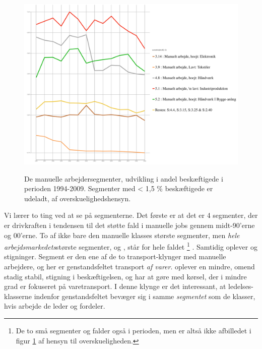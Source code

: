 %
   \begin{figure}[H]
   \begin{centering}
    \caption[Tidsserie: De manuelle arbejdersegmenter]{De manuelle arbejdersegmenter, udvikling i andel beskæftigede i perioden 1994-2009. Segmenter med < 1,5 \% beskæftigede er udeladt, af overskuelighedshensyn.} %
    \includegraphics[width=\textwidth]{fig/tidsserier/tid_seg_manuelt.pdf}
    \label{fig delanalyse3 klasse tid manueltsegment}
   \end{centering}
   \end{figure}   
%

Vi lærer to ting ved at se på segmenterne. Det første er at det er 4 segmenter, der er drivkraften i tendensen til det støtte fald i manuelle jobs gennem midt-90'erne og 00'erne. To af ikke bare den manuelle klasses største segmenter, men \emph{hele arbejdsmarkedets}største segmenter,  og , står for hele faldet%
%
    \footnote{ De to små segmenter  og  falder også i perioden, men er altså ikke afbilledet i figur \ref{fig delanalyse3 klasse tid manueltsegment} af hensyn til overskueligheden.}%
%
. Samtidig oplever  og  stigninger. Segment  er den ene af de to transport-klynger med manuelle arbejdere, og her er genstandsfeltet transport \emph{ af varer}.  oplever en mindre, omend stadig stabil, stigning i beskæftigelsen, og har at gøre med kørsel, der i mindre grad er fokuseret på varetransport. I denne klynge er det interessant, at ledelses-klasserne indenfor genstandsfeltet bevæger sig i samme \emph{segmentet} som de klasser, hvis arbejde de leder og fordeler.  


